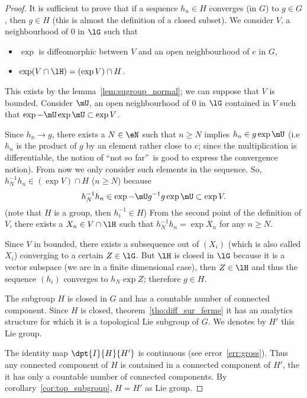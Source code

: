 \begin{proof}
 It is sufficient to prove that if a sequence $h_n\in H$ converges (in $G$) to $g\in G$, then $g\in H$ (this is almost the definition of a closed subset). We consider $V$, a neighbourhood of $0$ in $\lG$ such that

\begin{itemize}
\item $\exp$ is diffeomorphic between $V$ and an open neighbourhood  of $e$ in $G$,
\item $\exp(V\cap \lH)=(\exp V)\cap H$.
\end{itemize}
This exists by the lemma~\ref{lem:sugroup_normal}; we can suppose that $V$ is bounded. Consider $\mU$, an open neighbourhood of $0$ in $\lG$ contained in $V$ such that $\exp-\mU\exp\mU\subset\exp V$.

Since $h_n\to g$, there exists a $N\in\eN$ such that $n\geq N$ implies $h_n\in g\exp\mU$ (i.e $h_n$ is the product of $g$ by an element rather close to $e$; since the multiplication is differentiable, the notion of ``not so far''\ is good to express the convergence notion). From now we only consider such elements in the sequence. So, $h_N^{-1} h_n\in(\exp V)\cap H$ ($n\geq N$) because
\[
   h_N^{-1} h_n\in\exp-\mU g^{-1} g\exp\mU\subset\exp V.
\]
(note that $H$ is a group, then $h_i^{-1}\in H$) From the second point of the definition of $V$, there exists a $X_n\in V\cap\lH$ such that $h^{-1}_N h_n=\exp X_n$ for any $n\geq N$.

Since $V$ in bounded, there exists a subsequence out of $(X_i)$ (which is also called $X_i$) converging to a certain $Z\in\lG$. But $\lH$ is closed in $\lG$ because it is a vector subspace (we are in a finite dimensional case), then $Z\in\lH$ and thus the sequence $(h_i)$ converges to $h_N\exp Z$; therefore $g\in H$.

 The subgroup $H$ is closed in $G$ and has a countable number of connected component. Since $H$ is closed, theorem~\ref{tho:diff_sur_ferme} it has an analytics structure for which it is a topological Lie subgroup of $G$. We denotes by $H'$ this Lie group.

The identity map $\dpt{I}{H}{H'}$ is continuous (see error~\ref{err:gross}). Thus any connected component of $H$ is contained in a connected component of $H'$, the it has only a countable number of connected components. By corollary~\ref{cor:top_subgroup}, $H=H'$ as Lie group.

\end{proof}


